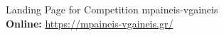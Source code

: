 \begin{figure}[H]
	\caption{
		Landing Page for Competition mpaineis-vgaineis
		\\
		\textbf{Online: } \url{https://mpaineis-vgaineis.gr/}
	}
	\label{fig:example}
\end{figure}
